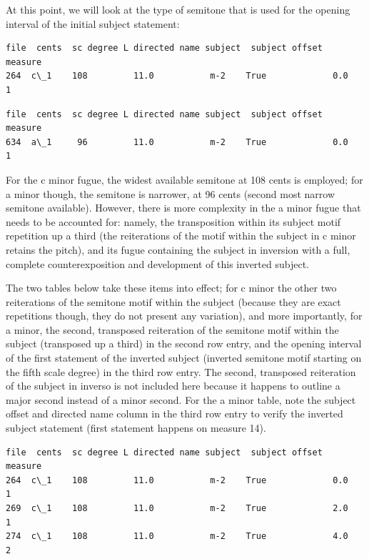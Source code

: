 At this point, we will look at the type of semitone that is used for the
opening interval of the initial subject statement:

\begin{Verbatim}[commandchars=\\\{\}]
    file  cents  sc degree L directed name subject  subject offset  measure
264  c\_1    108         11.0           m-2    True             0.0        1
\end{Verbatim}
\begin{Verbatim}[commandchars=\\\{\}]
    file  cents  sc degree L directed name subject  subject offset  measure
634  a\_1     96         11.0           m-2    True             0.0        1
\end{Verbatim}
    For the c minor fugue, the widest available semitone at 108 cents is
employed; for a minor though, the semitone is narrower, at 96 cents
(second most narrow semitone available). However, there is more
complexity in the a minor fugue that needs to be accounted for: namely,
the transposition within its subject motif repetition up a third (the
reiterations of the motif within the subject in c minor retains the
pitch), and its fugue containing the subject in inversion with a full,
complete counterexposition and development of this inverted subject.

The two tables below take these items into effect; for c minor the other
two reiterations of the semitone motif within the subject (because they
are exact repetitions though, they do not present any variation), and
more importantly, for a minor, the second, transposed reiteration of the
semitone motif within the subject (transposed up a third) in the second
row entry, and the opening interval of the first statement of the
inverted subject (inverted semitone motif starting on the fifth scale
degree) in the third row entry. The second, transposed reiteration of
the subject in inverso is not included here because it happens to
outline a major second instead of a minor second. For the a minor table,
note the subject offset and directed name column in the third row entry
to verify the inverted subject statement (first statement happens on
measure 14).

\begin{Verbatim}[commandchars=\\\{\}]
    file  cents  sc degree L directed name subject  subject offset  measure
264  c\_1    108         11.0           m-2    True             0.0        1
269  c\_1    108         11.0           m-2    True             2.0        1
274  c\_1    108         11.0           m-2    True             4.0        2
\end{Verbatim}



